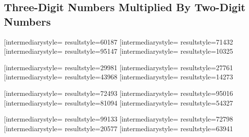 \documentclass[letterpaper, 17pt]{article}
\newcommand{\white}[1]{}
\begin{document}
\begin{center}
	\section*{Three-Digit Numbers Multiplied By Two-Digit Numbers}

	\vspace{0.3in}

	\opmul[intermediarystyle=\white, resultstyle=\white]{601}{87}\qquad
	\opmul[intermediarystyle=\white, resultstyle=\white]{714}{32}\qquad
	\opmul[intermediarystyle=\white, resultstyle=\white]{951}{47}\qquad
	\opmul[intermediarystyle=\white, resultstyle=\white]{103}{25}\qquad

	\vspace{0.5in}

	\opmul[intermediarystyle=\white, resultstyle=\white]{299}{81}\qquad
	\opmul[intermediarystyle=\white, resultstyle=\white]{277}{61}\qquad
	\opmul[intermediarystyle=\white, resultstyle=\white]{439}{68}\qquad
	\opmul[intermediarystyle=\white, resultstyle=\white]{142}{73}\qquad

	\vspace{0.5in}

	\opmul[intermediarystyle=\white, resultstyle=\white]{724}{93}\qquad
	\opmul[intermediarystyle=\white, resultstyle=\white]{950}{16}\qquad
	\opmul[intermediarystyle=\white, resultstyle=\white]{810}{94}\qquad
	\opmul[intermediarystyle=\white, resultstyle=\white]{543}{27}\qquad

	\vspace{0.5in}

	\opmul[intermediarystyle=\white, resultstyle=\white]{991}{33}\qquad
	\opmul[intermediarystyle=\white, resultstyle=\white]{727}{98}\qquad
	\opmul[intermediarystyle=\white, resultstyle=\white]{205}{77}\qquad
	\opmul[intermediarystyle=\white, resultstyle=\white]{639}{41}\qquad
\end{center}
\end{document}
